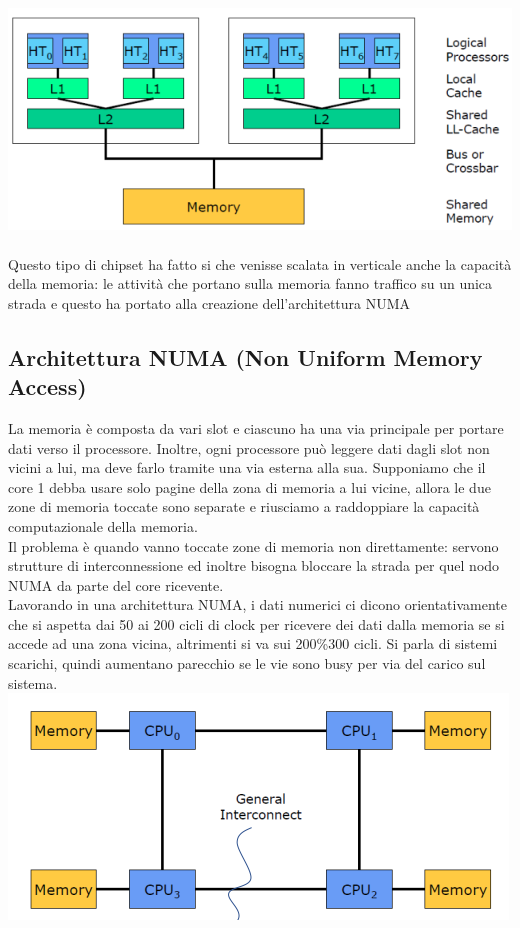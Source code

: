 \documentclass[14pt, oneside]{book}
\begin{document}
\includegraphics[scale=0.5]{immagini/smt}\\\\
Questo tipo di chipset ha fatto si che venisse scalata in verticale anche la capacità della memoria: le attività che portano sulla memoria fanno traffico su un unica strada e questo ha portato alla creazione dell'architettura NUMA
\subsection{Architettura NUMA (Non Uniform Memory Access)}
La memoria è composta da vari slot e ciascuno ha una via principale per portare dati verso il processore. Inoltre, ogni processore può leggere dati dagli slot non vicini a lui, ma deve farlo tramite una via esterna alla sua. Supponiamo che il core 1 debba usare solo pagine della zona di memoria a lui vicine, allora le due zone di memoria toccate sono separate e riusciamo a raddoppiare la capacità computazionale della memoria.\\ Il problema è quando vanno toccate zone di memoria non direttamente: servono strutture di interconnessione ed inoltre bisogna bloccare la strada per quel nodo NUMA da parte del core ricevente.\\ Lavorando in una architettura NUMA, i dati numerici ci dicono orientativamente che si aspetta dai 50 ai 200 cicli di clock per ricevere dei dati dalla memoria se si accede ad una zona vicina, altrimenti si va sui 200\%300 cicli. Si parla di sistemi scarichi, quindi aumentano parecchio se le vie sono busy per via del carico sul sistema.\\
\includegraphics[scale=0.5]{immagini/numa}
\end{document}
